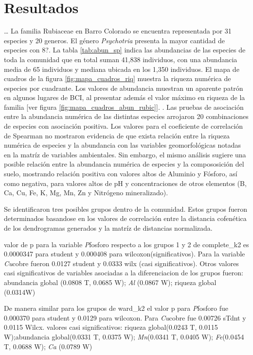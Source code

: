 \documentclass[11pt,]{article}
\begin{document}
\section{Resultados}\label{resultados}

\dots
La familia Rubiaceae en Barro Colorado se encuentra representada por 31
especies y 20 generos. El género \emph{Psychotria} presenta la mayor
cantidad de especies con 8?. La tabla \ref{tab:abun_sp} indica las
abundancias de las especies de toda la comunidad que en total suman
41,838 individuos, con una abundancia media de 65 individuos y mediana
ubicada en los 1,350 individuos. El mapa de cuadros de la figura
\ref{fig:mapa_cuadros_riq} muestra la riqueza numérica de especies por
cuadrante. Los valores de abundancia muestran un aparente patrón en
algunos lugares de BCI, al presentar además el valor máximo en riqueza
de la familia {[}ver figura \ref{fig:mapa_cuadros_abun_rubic}{]}. . Las
pruebas de asociación entre la abundancia numérica de las distintas
especies arrojaron 20 combinaciones de especies con asociación positiva.
Los valores para el coeficiente de correlación de Spearman no mostraron
evidencia de que exista relación entre la riqueza numérica de especies y
la abundancia con las variables geomorfológicas notadas en la matríz de
variables ambientales. Sin embargo, el mismo análisis sugiere una
posible relación entre la abundancia numérica de especies y la
compososición del suelo, mostrando relación positiva con valores altos
de Aluminio y Fósforo, así como negativa, para valores altos de pH y
concentraciones de otros elementos (B, Ca, Cu, Fe, K, Mg, Mn, Zn y
Nitrógeno mineralizado).

Se identificaron tres posibles grupos dentro de la comunidad. Estos
grupos fueron determinados basandose en los valores de correlación entre
la distancia cofenética de los dendrogramas generados y la matríz de
distancias normalizada.

valor de p para la variable \emph{P}fosforo respecto a los grupos 1 y 2
de complete\_k2 es 0.0000347 para student y 0.000408 para
wilcoxon(significativos). Para la variable \emph{Cu}cobre fueron 0.0127
student y 0.0333 wilx (casi significativos). Otros valores casi
significativos de variables asociadas a la diferenciacion de los grupos
fueron: abundancia global (0.0808 T, 0.0685 W); \emph{Al} (0.0867 W);
riqueza global (0.0314W)

De manera similar para los grupos de ward\_k2 el valor p para
\emph{P}fosforo fue 0.000370 para student y 0.0129 para wilcoxon. Para
\emph{Cu}cobre fue 0.00726 sTdnt y 0.0115 Wilcx. valores casi
significativos: riqueza global(0.0243 T, 0.0115 W);abundancia
global(0.0331 T, 0.0375 W); \emph{Mn}(0.0341 T, 0.0405 W);
\emph{Fe}(0.0454 T, 0.0688 W); \emph{Ca} (0.0789 W)
\end{document}
